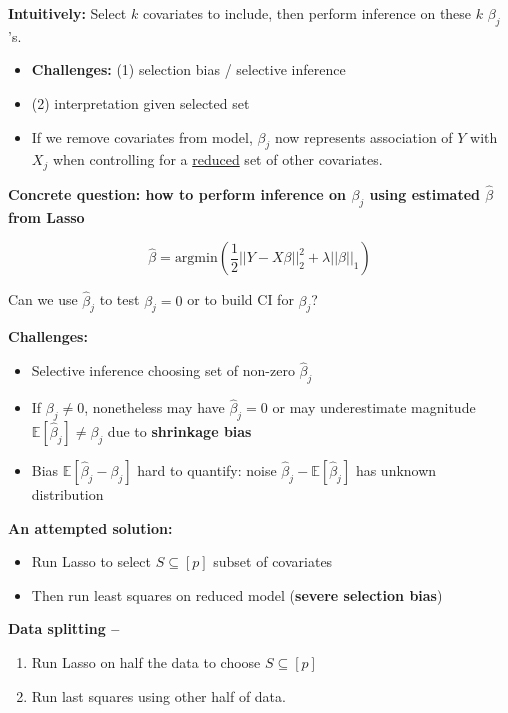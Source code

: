 \textbf{Intuitively:} Select $k$ covariates to include, then perform inference on these $k$ $\beta_j$'s.
\begin{itemize}
    \item[$\hookrightarrow$] \textbf{Challenges:} (1) selection bias / selective inference
    \item[] \hspace{5.5mm} (2) interpretation given selected set
\end{itemize}

\begin{itemize}
    \item[$\hookrightarrow$] If we remove covariates from model, $\beta_j$ now represents association of $Y$ with $X_j$ when controlling for a \underline{reduced} set of other covariates.
\end{itemize}

\textbf{Concrete question: how to perform inference on $\beta_j$ using estimated $\hat{\beta}$ from Lasso}

\[ \hat{\beta} = \text{argmin} \left( \frac{1}{2} ||Y - X\beta||_2^2 + \lambda ||\beta||_1 \right) \]

Can we use $\hat{\beta}_j$ to test $\beta_j = 0$ or to build CI for $\beta_j$?

\textbf{Challenges:}
\begin{itemize}
    \item Selective inference choosing set of non-zero $\hat{\beta}_j$
    \item If $\beta_j \neq 0$, nonetheless may have $\hat{\beta}_j = 0$ or may underestimate magnitude $\mathbb{E}[\hat{\beta}_j] \neq \beta_j$ due to \textbf{shrinkage bias}
    \item Bias $\mathbb{E}[\hat{\beta}_j - \beta_j]$ hard to quantify: noise $\hat{\beta}_j - \mathbb{E}[\hat{\beta}_j]$ has unknown distribution
\end{itemize}

\textbf{An attempted solution:}
\begin{itemize}
    \item Run Lasso to select $S \subseteq [p]$ subset of covariates
    \item Then run least squares on reduced model (\textbf{severe selection bias})
\end{itemize}

\textbf{Data splitting --}
\begin{enumerate}
    \item Run Lasso on half the data to choose $S \subseteq [p]$
    \item Run last squares using other half of data.
\end{enumerate}

